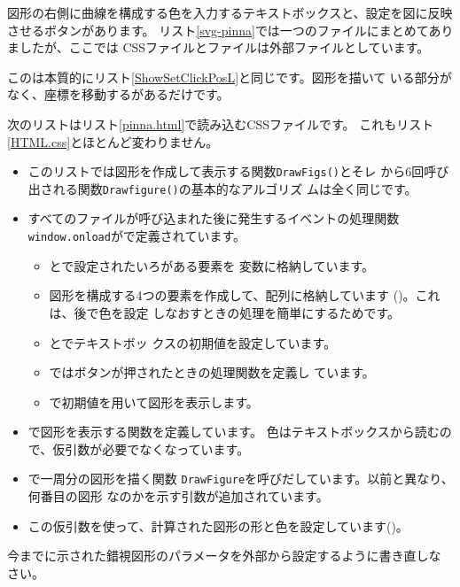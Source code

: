 図形の右側に曲線を構成する色を入力するテキストボックスと、設定を図に反映
させるボタンがあります。
リスト\ref{svg-pinna}では一つのファイルにまとめてありましたが、ここでは
CSSファイルと\JS ファイルは外部ファイルとしています。

この\HTML は本質的にリスト\ref{ShowSetClickPosL}と同じです。図形を描いて
いる部分がなく、座標を移動するがあるだけです。

次のリストはリスト\ref{pinna.html}で読み込むCSSファイルです。
これもリスト\ref{HTML.css}とほとんど変わりません。
\begin{itemize}
 \item このリストでは図形を作成して表示する関数\texttt{DrawFigs()}とそレ
       から6回呼び出される関数\texttt{Drawfigure()}の基本的なアルゴリズ
       ムは全く同じです。
 \item すべてのファイルが呼び込まれた後に発生するイベントの処理関数
       \texttt{window.onload}がで定義されています。
       \begin{itemize}
        \item {}とで設定されたいろがある要素を
              変数に格納しています。
        \item 図形を構成する4つの要素を作成して、配列に格納しています
              ()。これは、後で色を設定
              しなおすときの処理を簡単にするためです。
        \item {}とでテキストボッ
              クスの初期値を設定しています。
        \item {}ではボタンが押されたときの処理関数を定義し
              ています。
        \item {}で初期値を用いて図形を表示します。
       \end{itemize}
 \item {}で図形を表示する関数を定義しています。
       色はテキストボックスから読むので、仮引数が必要でなくなっています。
 \item {}で一周分の図形を描く関数
       \texttt{DrawFigure}を呼びだしています。以前と異なり、何番目の図形
       なのかを示す引数が追加されています。
 \item この仮引数を使って、計算された図形の形と色を設定しています()。
\end{itemize}
 \begin{Problem}
 今までに示された錯視図形のパラメータを外部から設定するように書き直しな
 さい。
 \end{Problem}